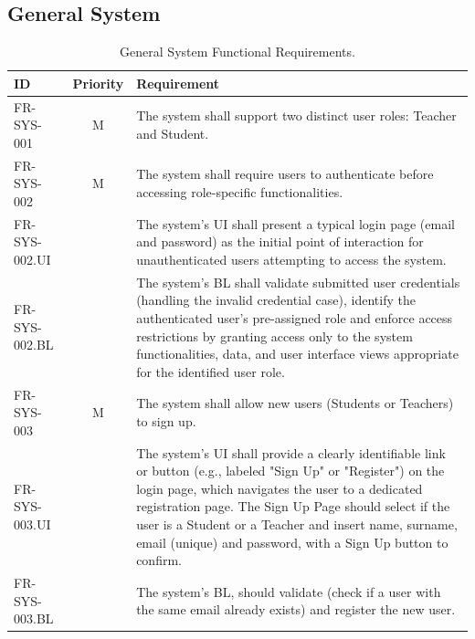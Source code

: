 \clearpage

\vspace*{1cm}

\subsection{General System}

\begin{table}[h]
    \centering
    \begin{tabular}{|l|c|p{10cm}|}
        \hline
        \textbf{ID} & \textbf{Priority} & \textbf{Requirement} \\
        \hline
        FR-SYS-001 & M & The system shall support two distinct user roles: Teacher and Student. \\
        \hline
        FR-SYS-002 & M & The system shall require users to authenticate before accessing role-specific functionalities. \\
        \quad FR-SYS-002.UI &  & \quad The system's UI shall present a typical login page (email and password) as the initial point of interaction for unauthenticated users attempting to access the system. \\
        \quad FR-SYS-002.BL &  & \quad The system's BL shall validate submitted user credentials (handling the invalid credential case), identify the authenticated user's pre-assigned role and enforce access restrictions by granting access only to the system functionalities, data, and user interface views appropriate for the identified user role. \\
        \hline
        FR-SYS-003 & M & The system shall allow new users (Students or Teachers) to sign up. \\
        \quad FR-SYS-003.UI &  & \quad The system’s UI shall provide a clearly identifiable link or button (e.g., labeled "Sign Up" or "Register") on the login page, which navigates the user to a dedicated registration page. The Sign Up Page should select if the user is a Student or a Teacher and insert name, surname, email (unique) and password, with a Sign Up button to confirm. \\
        \quad FR-SYS-003.BL &  & \quad The system’s BL, should validate (check if a user with the same email already exists) and register the new user. \\
        \hline
    \end{tabular}
    \caption{General System Functional Requirements.}
    \label{tab:GeneralSystemFR}
\end{table}

